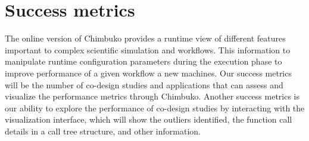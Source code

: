 \section{Success metrics}

The online version of Chimbuko provides a runtime view of different features important to complex scientific simulation and workflows. This information to manipulate runtime configuration parameters during the execution phase to improve performance of a given workflow a new machines. Our success metrics will be the number of co-design studies and applications that can assess and visualize the performance metrics through Chimbuko.  Another success metrics is our ability to explore the performance of co-design studies by interacting with the visualization interface, which will show the outliers identified, the function call details in a call tree structure, and other information. 
